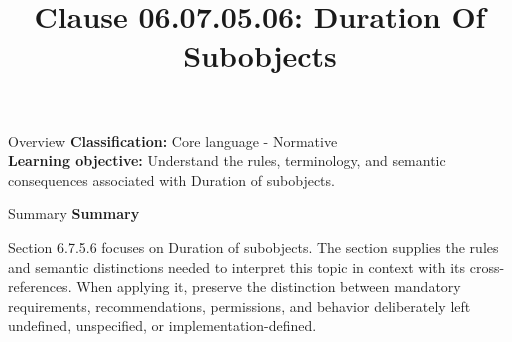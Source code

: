 \documentclass[10pt,letterpaper]{article}
\title{Clause 06.07.05.06: Duration Of Subobjects}
\author{}
\date{}
\begin{document}
\maketitle
\begin{CornellOverviewBox}{Overview}
\textbf{Classification:} Core language - Normative\\[2pt]
\textbf{Learning objective:} Understand the rules, terminology, and semantic consequences associated with Duration of subobjects.
\end{CornellOverviewBox}\begin{CornellSummaryBox}{Summary}
{\sffamily\bfseries\color{Accent} Summary}\par\vspace{3pt}Section 6.7.5.6 focuses on Duration of subobjects. The section supplies the rules and semantic distinctions needed to interpret this topic in context with its cross-references. When applying it, preserve the distinction between mandatory requirements, recommendations, permissions, and behavior deliberately left undefined, unspecified, or implementation-defined.
\end{CornellSummaryBox}
\end{document}
